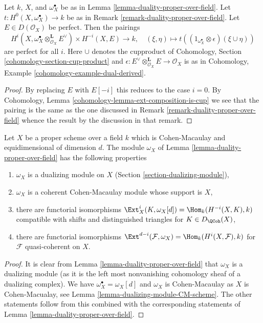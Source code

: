 \begin{lemma}
\label{lemma-duality-proper-over-field-perfect}
Let $k$, $X$, and $\omega_X^\bullet$
be as in Lemma \ref{lemma-duality-proper-over-field}.
Let $t : H^0(X, \omega_X^\bullet) \to k$ be as in
Remark \ref{remark-duality-proper-over-field}.
Let $E \in D(\mathcal{O}_X)$ be perfect. Then the pairings
$$
H^i(X, \omega_X^\bullet \otimes_{\mathcal{O}_X}^\mathbf{L} E^\vee)
\times
H^{-i}(X, E) \longrightarrow k, \quad
(\xi, \eta) \longmapsto
t((1_{\omega_X^\bullet} \otimes \epsilon)(\xi \cup \eta))
$$
are perfect for all $i$. Here $\cup$ denotes the cupproduct
of Cohomology, Section \ref{cohomology-section-cup-product} and
$\epsilon : E^\vee \otimes_{\mathcal{O}_X}^\mathbf{L} E \to \mathcal{O}_X$
is as in Cohomology, Example \ref{cohomology-example-dual-derived}.
\end{lemma}

\begin{proof}
By replacing $E$ with $E[-i]$ this reduces to the case $i = 0$.
By Cohomology, Lemma \ref{cohomology-lemma-ext-composition-is-cup}
we see that the pairing is the same as the one discussed
in Remark \ref{remark-duality-proper-over-field}
whence the result by the discussion in that remark.
\end{proof}

\begin{lemma}
\label{lemma-duality-proper-over-field-CM}
Let $X$ be a proper scheme over a field $k$ which is Cohen-Macaulay
and equidimensional of dimension $d$. The module $\omega_X$
of Lemma \ref{lemma-duality-proper-over-field} has the following properties
\begin{enumerate}
\item $\omega_X$ is a dualizing module on $X$
(Section \ref{section-dualizing-module}),
\item $\omega_X$ is a coherent Cohen-Macaulay module whose support is $X$,
\item there are functorial isomorphisms
$\Ext^i_X(K, \omega_X[d]) = \Hom_k(H^{-i}(X, K), k)$
compatible with shifts and distinguished triangles for $K \in D_\QCoh(X)$,
\item there are functorial isomorphisms
$\Ext^{d - i}(\mathcal{F}, \omega_X) = \Hom_k(H^i(X, \mathcal{F}), k)$
for $\mathcal{F}$ quasi-coherent on $X$.
\end{enumerate}
\end{lemma}

\begin{proof}
It is clear from Lemma \ref{lemma-duality-proper-over-field}
that $\omega_X$ is a dualizing module (as it is the left most
nonvanishing cohomology sheaf of a dualizing complex).
We have $\omega_X^\bullet = \omega_X[d]$ and $\omega_X$ is Cohen-Macaulay
as $X$ is Cohen-Macualay, see Lemma \ref{lemma-dualizing-module-CM-scheme}.
The other statements follow from this combined with the
corresponding statements of Lemma \ref{lemma-duality-proper-over-field}.
\end{proof}

